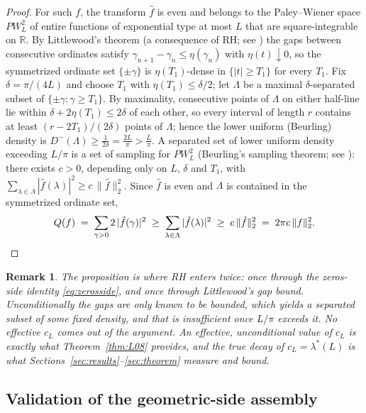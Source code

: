 ﻿\documentclass[11pt]{article}
\newtheorem{remark}[theorem]{Remark}
\newcommand{\R}{\mathbb{R}}
\newcommand{\lmin}{\lambda^{*}}
\newcommand{\fhat}{\hat f}
\begin{document}
\begin{proof}
For such $f$, the transform $\fhat$ is even and belongs to the
Paley--Wiener space $PW_L^2$ of entire functions of exponential type
at most $L$ that are square-integrable on $\R$.  By Littlewood's
theorem (a consequence of RH; see \cite[Ch.~XIII]{Titchmarsh1986}) the
gaps between consecutive ordinates satisfy
$\gamma_{n+1}-\gamma_n\le\eta(\gamma_n)$ with $\eta(t)\downarrow0$, so
the symmetrized ordinate set $\{\pm\gamma\}$ is $\eta(T_1)$-dense in
$\{|t|\ge T_1\}$ for every $T_1$.  Fix $\delta=\pi/(4L)$ and choose
$T_1$ with $\eta(T_1)\le\delta/2$; let $\Lambda$ be a maximal
$\delta$-separated subset of $\{\pm\gamma:\gamma\ge T_1\}$.  By
maximality, consecutive points of $\Lambda$ on either half-line lie
within $\delta+2\eta(T_1)\le2\delta$ of each other, so every interval
of length $r$ contains at least $(r-2T_1)/(2\delta)$ points of
$\Lambda$; hence the lower uniform (Beurling) density is
$D^{-}(\Lambda)\ge\frac{1}{2\delta}=\frac{2L}{\pi}>\frac{L}{\pi}$.  A
separated set of lower uniform density exceeding $L/\pi$ is a set of
sampling for $PW_L^2$ (Beurling's sampling theorem; see
\cite[Ch.~2--3]{Seip2004}): there exists $c>0$, depending only on $L$,
$\delta$ and $T_1$, with
$\sum_{\lambda\in\Lambda}|\fhat(\lambda)|^{2}\ge c\,\|\fhat\|_{2}^{2}$.
Since $\fhat$ is even and $\Lambda$ is contained in the symmetrized
ordinate set,
\[
  Q(f)\;=\;\sum_{\gamma>0}2\,|\fhat(\gamma)|^{2}
  \;\ge\;\sum_{\lambda\in\Lambda}|\fhat(\lambda)|^{2}
  \;\ge\;c\,\|\fhat\|_{2}^{2}
  \;=\;2\pi c\,\|f\|_{2}^{2}. \qedhere
\]
\end{proof}

\begin{remark}
The proposition is where RH enters twice: once through the zeros-side
identity \eqref{eq:zerosside}, and once through Littlewood's gap bound.
Unconditionally the gaps are only known to be bounded, which yields a
separated subset of some fixed density, and that is insufficient once
$L/\pi$ exceeds it.  No effective $c_L$ comes out of the argument.  An
effective, unconditional value of $c_L$ is exactly what
Theorem~\ref{thm:L08} provides, and the true decay of $c_L=\lmin(L)$
is what Sections~\ref{sec:results}--\ref{sec:theorem} measure and
bound.
\end{remark}

\subsection{Validation of the geometric-side assembly}
\label{sec:validation}
\end{document}
